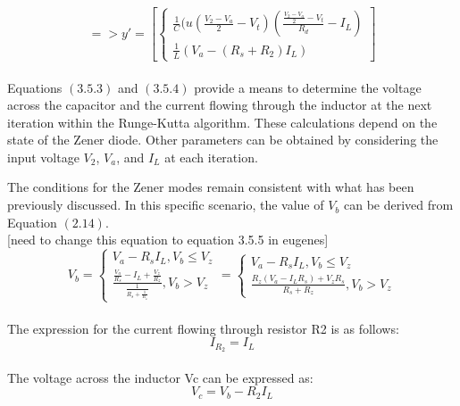 \begin{equation}
    =>y'=[\begin{cases}
        \frac{1}{C}(u(\frac{V_2-V_a}{2}-V_t)(\frac{\frac{V_2-V_a}{2}-V_t}{R_d}-I_L)\\
        \frac{1}{L}(V_a-(R_s+R_2)I_L)
    \end{cases}]
\end{equation}\\

Equations $(3.5.3)$ and $(3.5.4)$ provide a means to determine the voltage across the capacitor and the current flowing through the inductor at the next iteration within the Runge-Kutta algorithm. These calculations depend on the state of the Zener diode. Other parameters can be obtained by considering the input voltage $V_2$, $V_a$, and $I_L$ at each iteration.

The conditions for the Zener modes remain consistent with what has been previously discussed. In this specific scenario, the value of $V_b$ can be derived from Equation $(2.14)$.\\


[need to change this equation to equation 3.5.5 in eugenes]
\begin{equation}
    V_b=\begin{cases}
        V_a-R_sI_L, V_b \leq V_z\\
        \frac{\frac{V_a}{R_s}-I_L+\frac{V_z}{R_z}}{\frac{1}{R_s+\frac{1}{R_z}}}, V_b>V_z
    \end{cases}=\begin{cases}
        V_a-R_sI_L, V_b \leq V_z\\
        \frac{R_z(V_a-I_LR_s)+V_zR_s}{R_s+R_z}, V_b>V_z
    \end{cases} 
\end{equation}\\

The expression for the current flowing through resistor R2 is as follows:\\

\begin{equation}
    I_{R_2}=I_L
\end{equation}\\

The voltage across the inductor Vc can be expressed as:\\

\begin{equation}
    V_c=V_b-R_2I_L
\end{equation}\\

